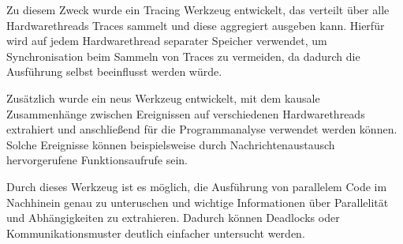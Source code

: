 Zu diesem Zweck wurde ein Tracing Werkzeug entwickelt, das verteilt über alle
Hardwarethreads Traces sammelt und diese aggregiert ausgeben kann. Hierfür wird
auf jedem Hardwarethread separater Speicher verwendet, um Synchronisation beim
Sammeln von Traces zu vermeiden, da dadurch die Ausführung selbst beeinflusst
werden würde.

Zusätzlich wurde ein neus Werkzeug entwickelt, mit dem kausale Zusammenhänge
zwischen Ereignissen auf verschiedenen Hardwarethreads extrahiert und
anschließend für die Programmanalyse verwendet werden können. Solche Ereignisse
können beispielsweise durch Nachrichtenaustausch hervorgerufene Funktionsaufrufe
sein.

Durch dieses Werkzeug ist es möglich, die Ausführung von parallelem Code im
Nachhinein genau zu unteruschen und wichtige Informationen über Parallelität und
Abhängigkeiten zu extrahieren. Dadurch können Deadlocks oder
Kommunikationsmuster deutlich einfacher untersucht werden.

% 
% 


